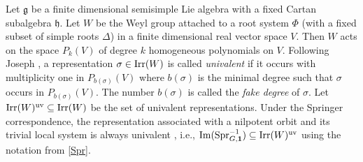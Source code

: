 \documentclass[reqno,12pt]{amsart}
\numberwithin{equation}{section}
\theoremstyle{plain}
\newtheorem{Thm}{Theorem}[section]
\newtheorem{Prop}[Thm]{Proposition}
\theoremstyle{definition}
\newcommand{\Ann}{\mathrm{Ann}}
\renewcommand{\subset}{\subseteq}
\newcommand{\lest}{\leqslant}
\begin{document}
Let $\mathfrak{g}$ be a finite dimensional semisimple Lie algebra with a fixed Cartan subalgebra $\mathfrak{h}$.
Let $W$ be the Weyl group attached to a root system $\Phi$ (with a fixed subset of simple roots $\Delta$) in a finite dimensional real vector space $V$. Then $W$ acts on the space $P_k(V)$ of degree $k$ homogeneous polynomials on $V$.  
Following Joseph \cite{J80-2}, a representation $\sigma\in {\rm Irr}(W)$ is called \emph{univalent} if it
occurs with multiplicity one in  $P_{b(\sigma)}(V)$ where $b(\sigma)$ is the minimal degree  such that $\sigma$ occurs in $P_{b(\sigma)}(V)$.
The number $b(\sigma)$ is called the \emph{fake degree} of $\sigma$.
Let ${\rm Irr}(W)^{\rm uv} \subset {\rm Irr}(W)$ be the set of univalent representations. 
Under the Springer correspondence, the representation associated with a nilpotent orbit and its trivial local system is always univalent \cite[Corollary~4]{BM}, i.e., ${\rm Im}({\rm Spr}_{G,\mathbf{1}}^{-1}) \subseteq {\rm Irr}(W)^{\rm uv}$ using the notation from \ref{Spr}.
\end{document}
